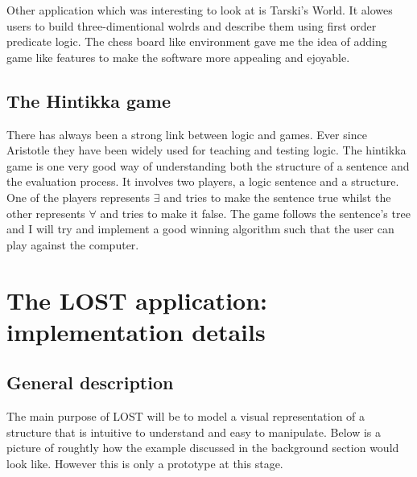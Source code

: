 \documentclass{article}
\begin{document}
\noindent Other application which was interesting to look at is Tarski's World. It alowes users to build three-dimentional wolrds and describe them using first order predicate logic. The chess board like environment gave me the idea of adding game like features to make the software more appealing and ejoyable. 

\subsection{The Hintikka game}
There has always been a strong link between logic and games. Ever since Aristotle they have been widely used for teaching and testing logic. The hintikka game is one very good way of understanding both the structure of a sentence and the evaluation process. It involves two players, a logic sentence and a structure. One of the players represents $\exists$ and tries to make the sentence true whilst the other represents $\forall$ and tries to make it false. The game follows the sentence's tree and I will try and implement a good winning algorithm such that the user can play against the computer.  

\newpage
\section{The LOST application: implementation details}

\subsection{General description}

\noindent The main purpose of LOST will be to model a visual representation of a structure that is intuitive to understand and easy to manipulate. Below is a picture of roughtly how the example discussed in the background section would look like. However this is only a prototype at this stage.\\
\end{document}

